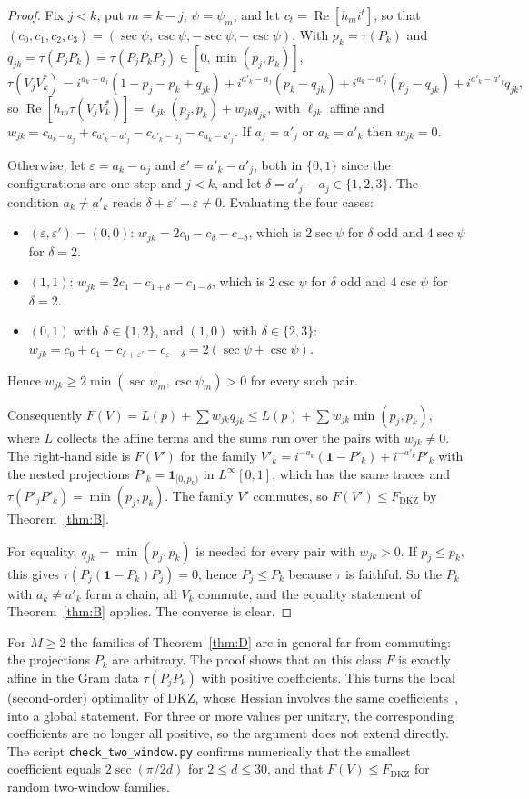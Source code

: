 \documentclass[11pt]{amsart}
\theoremstyle{definition}
\theoremstyle{remark}
\renewcommand{\Re}{\operatorname{Re}}
\newcommand{\FD}{F_{\mathrm{DKZ}}}
\newcommand{\one}{\mathbf{1}}
\begin{document}
\begin{proof}
Fix $j<k$, put $m=k-j$, $\psi=\psi_m$, and let $c_t=\Re[h_mi^t]$, so that $(c_0,c_1,c_2,c_3)=(\sec\psi,\csc\psi,-\sec\psi,-\csc\psi)$.
With $p_k=\tau(P_k)$ and $q_{jk}=\tau(P_jP_k)=\tau(P_jP_kP_j)\in[0,\min(p_j,p_k)]$,
\[
\tau(V_jV_k^*)=i^{a_k-a_j}(1-p_j-p_k+q_{jk})+i^{a'_k-a_j}(p_k-q_{jk})+i^{a_k-a'_j}(p_j-q_{jk})+i^{a'_k-a'_j}q_{jk},
\]
so $\Re[h_m\tau(V_jV_k^*)]=\ell_{jk}(p_j,p_k)+w_{jk}q_{jk}$, with $\ell_{jk}$ affine and
$w_{jk}=c_{a_k-a_j}+c_{a'_k-a'_j}-c_{a'_k-a_j}-c_{a_k-a'_j}$. If $a_j=a'_j$ or $a_k=a'_k$ then $w_{jk}=0$.

Otherwise, let $\varepsilon=a_k-a_j$ and $\varepsilon'=a'_k-a'_j$, both in $\{0,1\}$ since the configurations are
one-step and $j<k$, and let $\delta=a'_j-a_j\in\{1,2,3\}$. The condition $a_k\ne a'_k$ reads
$\delta+\varepsilon'-\varepsilon\ne0$. Evaluating the four cases:
\begin{itemize}
\item $(\varepsilon,\varepsilon')=(0,0)$: $w_{jk}=2c_0-c_\delta-c_{-\delta}$, which is $2\sec\psi$ for $\delta$ odd and $4\sec\psi$ for
$\delta=2$.
\item $(1,1)$: $w_{jk}=2c_1-c_{1+\delta}-c_{1-\delta}$, which is $2\csc\psi$ for $\delta$ odd and $4\csc\psi$ for $\delta=2$.
\item $(0,1)$ with $\delta\in\{1,2\}$, and $(1,0)$ with $\delta\in\{2,3\}$: $w_{jk}=c_0+c_1-c_{\delta+\varepsilon'}-c_{\varepsilon-\delta}=2(\sec\psi+\csc\psi)$.
\end{itemize}
Hence $w_{jk}\ge2\min(\sec\psi_m,\csc\psi_m)>0$ for every such pair.

Consequently $F(V)=L(p)+\sum w_{jk}q_{jk}\le L(p)+\sum w_{jk}\min(p_j,p_k)$, where $L$ collects the affine terms and the
sums run over the pairs with $w_{jk}\ne0$. The right-hand side is $F(V')$ for the family $V'_k=i^{-a_k}(\one-P'_k)+i^{-a'_k}P'_k$
with the nested projections $P'_k=\mathbf 1_{[0,p_k)}$ in $L^\infty[0,1]$, which has the same traces and
$\tau(P'_jP'_k)=\min(p_j,p_k)$. The family $V'$ commutes, so $F(V')\le\FD$ by Theorem~\ref{thm:B}.

For equality, $q_{jk}=\min(p_j,p_k)$ is needed for every pair with $w_{jk}>0$. If $p_j\le p_k$, this gives
$\tau(P_j(\one-P_k)P_j)=0$, hence $P_j\le P_k$ because $\tau$ is faithful. So the $P_k$ with $a_k\ne a'_k$ form a
chain, all $V_k$ commute, and the equality statement of Theorem~\ref{thm:B} applies. The converse is clear.
\end{proof}

For $M\ge2$ the families of Theorem~\ref{thm:D} are in general far from commuting: the projections $P_k$ are arbitrary. The
proof shows that on this class $F$ is exactly affine in the Gram data $\tau(P_jP_k)$ with positive coefficients. This
turns the local (second-order) optimality of DKZ, whose Hessian involves the same coefficients~\cite{repo}, into a
global statement. For three or more values per unitary, the corresponding coefficients are no longer all positive,
so the argument does not extend directly. The script \texttt{check\_two\_window.py} confirms numerically that the smallest
coefficient equals $2\sec(\pi/2d)$ for $2\le d\le30$, and that $F(V)\le\FD$ for random two-window families.
\end{document}
